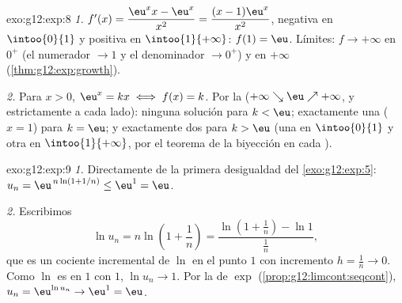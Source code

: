 \begin{solution}{exo:g12:exp:8}
\emph{1.} $f'(x) = \dfrac{\eu^x x - \eu^x}{x^2} = \dfrac{(x-1)\eu^x}{x^2}$,
negativa en $\intoo{0}{1}$ y positiva en $\intoo{1}{+\infty}$: 
$f(1) = \eu$. Límites: $f \to +\infty$ en $0^+$ (el numerador $\to 1$ y el
denominador $\to 0^+$) y en $+\infty$ (\cref{thm:g12:exp:growth}).

\emph{2.} Para $x > 0$, $\eu^x = kx \iff f(x) = k$. Por la  ($+\infty \searrow \eu \nearrow +\infty$,  y
estrictamente  a cada lado): ninguna solución para $k < \eu$;
exactamente una ($x = 1$) para $k = \eu$; y exactamente dos para $k > \eu$
(una en $\intoo{0}{1}$ y otra en $\intoo{1}{+\infty}$, por el teorema de la
biyección en cada ).
\end{solution}

\begin{solution}{exo:g12:exp:9}
\emph{1.} Directamente de la primera desigualdad del
\cref{exo:g12:exp:5}: $u_n = \eu^{\,n\ln(1+1/n)} \leq \eu^1 = \eu$.

\emph{2.} Escribimos
\[
\ln u_n = n \ln\!\left(1 + \frac1n\right)
= \frac{\ln\!\left(1 + \frac1n\right) - \ln 1}{\frac1n},
\]
que es un cociente incremental de $\ln$ en el punto $1$ con incremento
$h = \frac1n \to 0$. Como $\ln$ es  en $1$ con  $1$,
$\ln u_n \to 1$. Por la  de $\exp$
(\cref{prop:g12:limcont:seqcont}), $u_n = \eu^{\ln u_n} \to \eu^1 = \eu$.
\end{solution}

